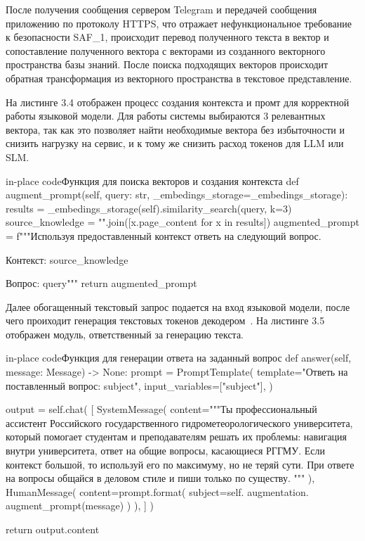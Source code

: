 После получения сообщения сервером Telegram и передачей сообщения приложению
по протоколу HTTPS, что отражает нефункциональное требование к безопасности
SAF\_1, происходит перевод полученного текста в вектор и сопоставление
полученного вектора с векторами из созданного векторного пространства 
базы знаний. После поиска подходящих векторов происходит обратная трансформация
из векторного пространства в текстовое представление. 

На листинге 3.4 отображен процесс создания контекста и промт для
корректной работы языковой модели. Для работы системы выбираются 3 релевантных
вектора, так как это позволяет найти необходимые вектора без избыточности и
снизить нагрузку на сервис, и к тому же снизить расход токенов для LLM или
SLM\@.

\begin{codepiece}{in-place code}{Функция для поиска векторов и создания контекста}
    def augment_prompt(self, query: str, _embedings_storage=_embedings_storage):
        results = _embedings_storage(self).similarity_search(query, k=3)
        source_knowledge = "\n".join([x.page_content for x in results])
        augmented_prompt = f"""Используя предоставленный контекст ответь на следующий вопрос.

        Контекст:
        {source_knowledge}

        Вопрос: {query}"""
        return augmented_prompt
\end{codepiece}

Далее обогащенный текстовый запрос подается на вход языковой модели, после чего
проиходит генерация текстовых токенов декодером~\cite{a}. На листинге 3.5
отображен модуль, ответственный за генерацию текста. 

\begin{codepiece}{in-place code}{Функция для генерации ответа на заданный вопрос}
        def answer(self, message: Message) -> None:
            prompt = PromptTemplate(
                template="Ответь на поставленный вопрос: {subject}",
                input_variables=["subject"],
            )
    
            output = self.chat(
                [
                    SystemMessage(
                        content="""Ты профессиональный ассистент Российского
                        государственного гидрометеорологического университета,
                        который помогает студентам и преподавателям решать их
                        проблемы: навигация внутри университета, ответ на общие
                        вопросы, касающиеся РГГМУ. Если контекст большой, то
                        используй его по максимуму, но не теряй сути.
                        При ответе на вопросы общайся в деловом стиле и пиши
                        только по существу. """
                    ),
                    HumanMessage(
                        content=prompt.format(
                            subject=self.
                            augmentation.
                            augment_prompt(message)
                        )
                    ),
                ]
            )
  

            return output.content
\end{codepiece}

